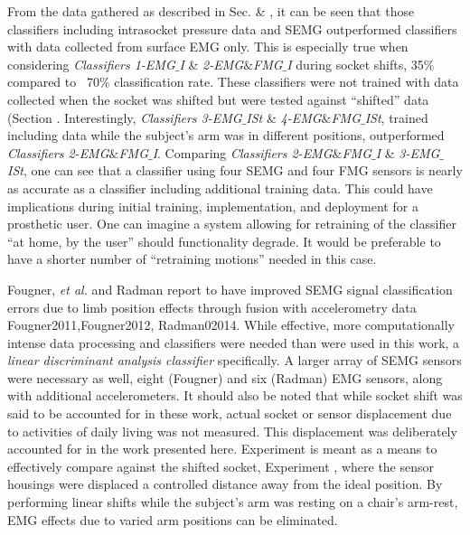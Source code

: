 \documentclass[twocolumn]{sagej}
\begin{document}
From the data gathered as described in Sec. \textit{} \& \textit{}, it can be seen that those classifiers including intrasocket pressure data and SEMG outperformed classifiers with data collected from surface EMG only.  This is especially true when considering \textit{Classifiers 1-EMG$\_$I} \& \textit{2-EMG$\&$FMG$\_$I} during socket shifts, 35$\%$ compared to ~70$\%$ classification rate.  These classifiers were not trained with data collected when the socket was shifted but were tested against ``shifted'' data (Section \textit{}.  Interestingly, \textit{Classifiers 3-EMG$\_$ISt} \& \textit{4-EMG$\&$FMG$\_$ISt}, trained including data while the subject's arm was in different positions, outperformed \textit{Classifiers 2-EMG$\&$FMG$\_$I}.  Comparing \textit{Classifiers 2-EMG$\&$FMG$\_$I} \& \textit{3-EMG$\_$ISt}, one can see that a classifier using four SEMG and four FMG sensors is nearly as accurate as a classifier including additional training data.  This could have implications during initial training, implementation, and deployment for a prosthetic user. One can imagine a system allowing for retraining of the classifier ``at home, by the user'' should functionality degrade. It would be preferable to have a shorter number of ``retraining motions'' needed in this case.\par \noindent
Fougner, \textit{et al.} and Radman report to have improved SEMG signal classification errors due to limb position effects through fusion with accelerometry data {Fougner2011,Fougner2012, Radman02014}. While effective, more computationally intense data processing and classifiers were needed than were used in this work, a \textit{linear discriminant analysis classifier} specifically. A larger array of SEMG sensors were necessary as well, eight (Fougner) and six (Radman) EMG sensors, along with additional accelerometers.  It should also be noted that while socket shift was said to be accounted for in these work, actual socket or sensor displacement due to activities of daily living was not measured. This displacement was deliberately accounted for in the work presented here.  Experiment \textit{} is meant as a means to effectively compare against the shifted socket, Experiment \textit{}, where the sensor housings were displaced a controlled distance away from the ideal position.  By performing linear shifts while the subject's arm was resting on a chair's arm-rest, EMG effects due to varied arm positions can be eliminated.\par \noindent
\end{document}
